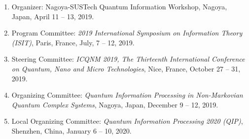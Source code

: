 \begin{enumerate}

\item
Organizer:
Nagoya-SUSTech Quantum Information Workshop,
Nagoya, Japan, April 11 -- 13, 2019.

\item
Program Committee: 
{\em 2019 International Symposium on Information Theory (ISIT)}, 
Paris, France, July, 7 -- 12, 2019. 

\item
Steering Committee: 
{\em ICQNM 2019, The Thirteenth International Conference on Quantum, Nano and Micro Technologies}, 
Nice, France, October 27 -- 31, 2019.

\item
Organizing Committee: 
{\em Quantum Information Processing in Non-Markovian Quantum Complex Systems}, 
Nagoya, Japan, December  9 -- 12, 2019. 

\item
Local Organizing Committee: 
{\em Quantum Information Processing 2020 (QIP)}, 
Shenzhen, China, January 6 -- 10, 2020.

\end{enumerate}

